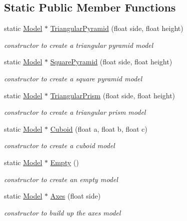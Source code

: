 \subsection*{Static Public Member Functions}
\begin{DoxyCompactItemize}
\item 
static \mbox{\hyperlink{class_model}{Model}} $\ast$ \mbox{\hyperlink{class_sample_models_ac979fefcbc81571af56a2cf3c415497b}{Triangular\+Pyramid}} (float side, float height)
\begin{DoxyCompactList}\small\item\em constructor to create a triangular pyramid model \end{DoxyCompactList}\item 
static \mbox{\hyperlink{class_model}{Model}} $\ast$ \mbox{\hyperlink{class_sample_models_a0a5afe183db2a5e7e59f825e6ac736e6}{Square\+Pyramid}} (float side, float height)
\begin{DoxyCompactList}\small\item\em constructor to create a square pyramid model \end{DoxyCompactList}\item 
static \mbox{\hyperlink{class_model}{Model}} $\ast$ \mbox{\hyperlink{class_sample_models_ad9be52995d798b78ad2c04c1b3c1f4e4}{Triangular\+Prism}} (float side, float height)
\begin{DoxyCompactList}\small\item\em constructor to create a triangular prism model \end{DoxyCompactList}\item 
static \mbox{\hyperlink{class_model}{Model}} $\ast$ \mbox{\hyperlink{class_sample_models_a5e39e1ad1bcaec4b4ce617332e996caf}{Cuboid}} (float a, float b, float c)
\begin{DoxyCompactList}\small\item\em constructor to create a cuboid model \end{DoxyCompactList}\item 
static \mbox{\hyperlink{class_model}{Model}} $\ast$ \mbox{\hyperlink{class_sample_models_a890001f4e859021afe59bd956245e2ad}{Empty}} ()
\begin{DoxyCompactList}\small\item\em constructor to create an empty model \end{DoxyCompactList}\item 
static \mbox{\hyperlink{class_model}{Model}} $\ast$ \mbox{\hyperlink{class_sample_models_a07f69bc5ff6c60078a642ba7e090bf6c}{Axes}} (float side)
\begin{DoxyCompactList}\small\item\em constructor to build up the axes model \end{DoxyCompactList}\end{DoxyCompactItemize}


